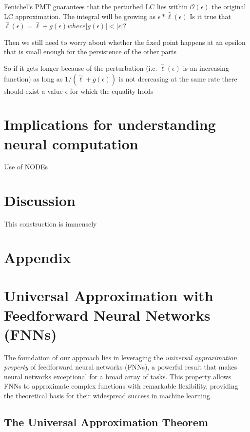 \documentclass{article}
\theoremstyle{definition}
\theoremstyle{remark}
\begin{document}
Fenichel's PMT guarantees that the perturbed LC lies within $\mathcal{O}(\epsilon)$ the original LC approximation.
The integral will be growing as $\epsilon * \hat \ell(\epsilon)$
Is it true that $\hat \ell(\epsilon) = \hat \ell + g(\epsilon) where |g(\epsilon)|<|\epsilon|$?

Then we still need to worry about whether the fixed point happens at an epsilon that is small enough for the persistence of the other parts


So if it gets longer because of the perturbation (i.e. $\hat \ell(\epsilon)$ is an increasing function) as long as $1/(\hat \ell+g(\epsilon))$ is not decreasing at the same rate there should exist a value $\epsilon$ for which the equality holds


\section{Implications for understanding neural computation}

Use of NODEs \citep{kim2021inferring}




\section{Discussion}


This construction is immensely 

\newpage



\section{Appendix}
\section{Universal Approximation with Feedforward Neural Networks (FNNs)}

The foundation of our approach lies in leveraging the \textit{universal approximation property} of feedforward neural networks (FNNs), a powerful result that makes neural networks exceptional for a broad array of tasks. This property allows FNNs to approximate complex functions with remarkable flexibility, providing the theoretical basis for their widespread success in machine learning.

\subsection{The Universal Approximation Theorem}
\end{document}
